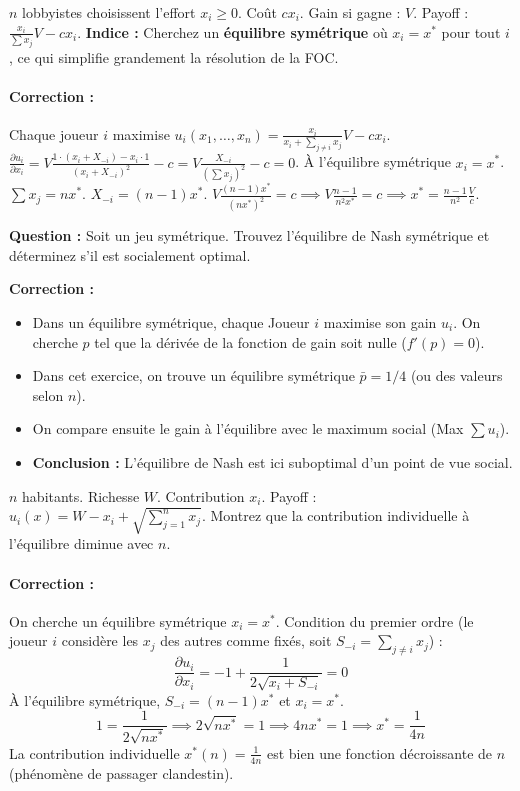 \begin{exemple}
$n$ lobbyistes choisissent l'effort $x_i \ge 0$. Coût $cx_i$. Gain si gagne : $V$. Payoff : $\frac{x_i}{\sum x_j}V - cx_i$.
\textbf{Indice :} Cherchez un \textbf{équilibre symétrique} où $x_i = x^*$ pour tout $i$, ce qui simplifie grandement la résolution de la FOC.

\paragraph{Correction :}
Chaque joueur $i$ maximise $u_i(x_1, \dots, x_n) = \frac{x_i}{x_i + \sum_{j \ne i} x_j} V - c x_i$.
$\frac{\partial u_i}{\partial x_i} = V \frac{1 \cdot (x_i + X_{-i}) - x_i \cdot 1}{(x_i + X_{-i})^2} - c = V \frac{X_{-i}}{(\sum x_j)^2} - c = 0$.
À l'équilibre symétrique $x_i = x^*$. $\sum x_j = n x^*$. $X_{-i} = (n-1)x^*$.
$V \frac{(n-1)x^*}{(n x^*)^2} = c \implies V \frac{n-1}{n^2 x^*} = c \implies x^* = \frac{n-1}{n^2} \frac{V}{c}$.
\end{exemple}

\begin{exemple}
\textbf{Question :}
Soit un jeu symétrique. Trouvez l'équilibre de Nash symétrique et déterminez s'il est socialement optimal.

\textbf{Correction :}
\begin{itemize}
    \item Dans un équilibre symétrique, chaque Joueur $i$ maximise son gain $u_i$. On cherche $p$ tel que la dérivée de la fonction de gain soit nulle ($f'(p) = 0$).
    \item Dans cet exercice, on trouve un équilibre symétrique $\bar{p} = 1/4$ (ou des valeurs selon $n$).
    \item On compare ensuite le gain à l'équilibre avec le maximum social (Max $\sum u_i$).
    \item \textbf{Conclusion :} L'équilibre de Nash est ici suboptimal d'un point de vue social.
\end{itemize}


\end{exemple}

\begin{exemple}
$n$ habitants. Richesse $W$. Contribution $x_i$. Payoff : $u_i(x) = W - x_i + \sqrt{\sum_{j=1}^n x_j}$. Montrez que la contribution individuelle à l'équilibre diminue avec $n$.

\paragraph{Correction :}
On cherche un équilibre symétrique $x_i = x^*$.
Condition du premier ordre (le joueur $i$ considère les $x_j$ des autres comme fixés, soit $S_{-i} = \sum_{j \ne i} x_j$) :
$$ \frac{\partial u_i}{\partial x_i} = -1 + \frac{1}{2\sqrt{x_i + S_{-i}}} = 0 $$
À l'équilibre symétrique, $S_{-i} = (n-1)x^*$ et $x_i = x^*$.
$$ 1 = \frac{1}{2\sqrt{n x^*}} \implies 2\sqrt{n x^*} = 1 \implies 4n x^* = 1 \implies x^* = \frac{1}{4n} $$
La contribution individuelle $x^*(n) = \frac{1}{4n}$ est bien une fonction décroissante de $n$ (phénomène de passager clandestin).
\end{exemple}
